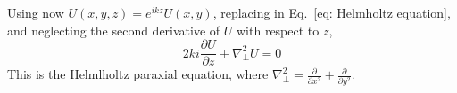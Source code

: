 \documentclass{iucr}              %
\begin{document}
Using now $U(x,y,z)=e^{i k z}U(x,y)$, replacing in Eq.~\ref{eq: Helmholtz equation}, and neglecting the second derivative of $U$ with respect to $z$,
\begin{equation}\label{eq: Helmholtz paraxial equation}
2 k i \frac{\partial U}{\partial z} + \nabla_{\perp}^2 U = 0
\end{equation}
This is the Helmlholtz paraxial equation, where $\nabla^2_{\perp} = \frac{\partial}{\partial x^2} + \frac{\partial}{\partial y^2}$.

% 
% 
% 
% 
% 
% 
% 
% 
% 
% 
% 
% 
\end{document}
